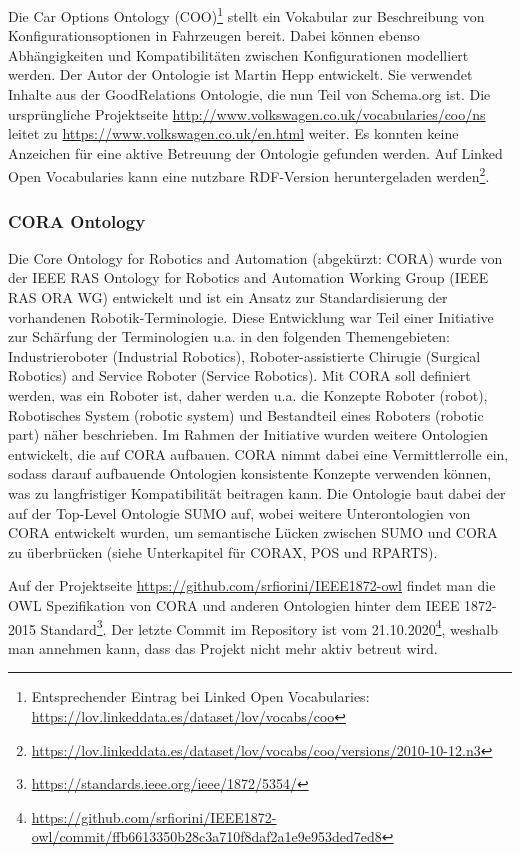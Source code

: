 \documentclass{article}
\begin{document}
Die Car Options Ontology (COO)\footnote{Entsprechender Eintrag bei Linked Open Vocabularies: \url{https://lov.linkeddata.es/dataset/lov/vocabs/coo}} stellt ein Vokabular zur Beschreibung von Konfigurationsoptionen in Fahrzeugen bereit.
Dabei können ebenso Abhängigkeiten und Kompatibilitäten zwischen Konfigurationen modelliert werden.
Der Autor der Ontologie ist Martin Hepp entwickelt.
Sie verwendet Inhalte aus der GoodRelations Ontologie, die nun Teil von Schema.org ist.
Die ursprüngliche Projektseite \url{http://www.volkswagen.co.uk/vocabularies/coo/ns} leitet zu \url{https://www.volkswagen.co.uk/en.html} weiter.
Es konnten keine Anzeichen für eine aktive Betreuung der Ontologie gefunden werden.
Auf Linked Open Vocabularies kann eine nutzbare RDF-Version heruntergeladen werden\footnote{\url{https://lov.linkeddata.es/dataset/lov/vocabs/coo/versions/2010-10-12.n3}}.

\subsubsection{CORA Ontology}


Die Core Ontology for Robotics and Automation (abgekürzt: CORA) \cite{prestes2014core} wurde von der IEEE RAS Ontology for Robotics and Automation Working Group (IEEE RAS ORA WG) entwickelt und ist ein Ansatz zur Standardisierung der vorhandenen Robotik-Terminologie.
Diese Entwicklung war Teil einer Initiative zur Schärfung der Terminologien u.a. in den folgenden Themengebieten: Industrieroboter (Industrial Robotics), Roboter-assistierte Chirugie (Surgical Robotics) and Service Roboter (Service Robotics).
Mit CORA soll definiert werden, was ein Roboter ist, daher werden u.a. die Konzepte Roboter (robot), Robotisches System (robotic system) und Bestandteil eines Roboters (robotic part) näher beschrieben.
Im Rahmen der Initiative wurden weitere Ontologien entwickelt, die auf CORA aufbauen.
CORA nimmt dabei eine Vermittlerrolle ein, sodass darauf aufbauende Ontologien konsistente Konzepte verwenden können, was zu langfristiger Kompatibilität beitragen kann.
Die Ontologie baut dabei der auf der Top-Level Ontologie SUMO auf, wobei weitere Unterontologien von CORA entwickelt wurden, um semantische Lücken zwischen SUMO und CORA zu überbrücken (siehe Unterkapitel für CORAX, POS und RPARTS).

Auf der Projektseite \url{https://github.com/srfiorini/IEEE1872-owl} findet man die OWL Spezifikation von CORA und anderen Ontologien hinter dem IEEE 1872-2015 Standard\footnote{\url{https://standards.ieee.org/ieee/1872/5354/}}. Der letzte Commit im Repository ist vom 21.10.2020\footnote{\url{https://github.com/srfiorini/IEEE1872-owl/commit/ffb6613350b28c3a710f8daf2a1e9e953ded7ed8}}, weshalb man annehmen kann, dass das Projekt nicht mehr aktiv betreut wird.
\end{document}
